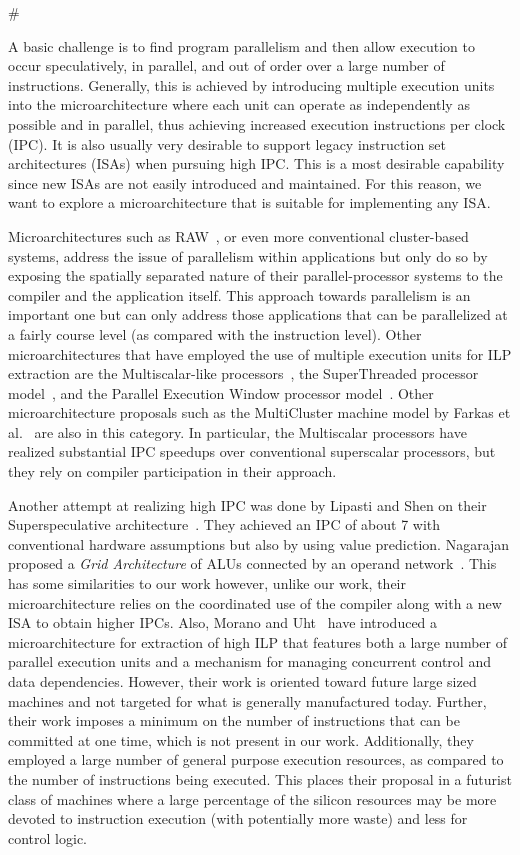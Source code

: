 #\documentclass[10pt,dvips]{article}
\begin{document}
A basic challenge 
is to find program parallelism and then allow execution to occur
speculatively, in parallel, and out of order over 
a large number of instructions.
Generally, this is achieved by introducing multiple
execution units into the microarchitecture where each unit
can operate as independently as possible and in parallel, thus
achieving increased execution instructions per clock (IPC).
It is also usually very desirable to support legacy instruction
set architectures (ISAs) when pursuing high IPC. 
This is a most desirable capability since new ISAs are
not easily introduced and maintained.
For this reason, we want to explore a
microarchitecture that is suitable for implementing any ISA.

Microarchitectures such as RAW~\cite{waingold97,taylor02},
or even more conventional cluster-based systems,
address the issue of parallelism within applications but only do so
by exposing the spatially separated nature of their
parallel-processor systems to the compiler and the application itself.
This approach towards parallelism is an important one but
can only address those applications that can be parallelized at
a fairly course level (as compared with the instruction level).
Other microarchitectures that have employed the
use of multiple execution units for ILP extraction are the Multiscalar-like
processors~\cite{Sohi95,sundararaman97multiscalar},
the SuperThreaded processor model~\cite{tsai96superthread},
and
the Parallel Execution Window processor model~\cite{kemp96pew}.
Other microarchitecture proposals such as the MultiCluster machine
model by 
Farkas et al.~\cite{farkas97multicluster} are also in this category.
In particular, the Multiscalar processors have
realized substantial IPC speedups over conventional superscalar
processors, but they rely on compiler participation in their
approach.

Another attempt at realizing high IPC was done by
Lipasti and Shen on their Superspeculative
architecture~\cite{Lip97}.  They achieved an IPC of
about 7 with conventional hardware assumptions but
also by using value prediction.
Nagarajan proposed a {\em Grid Architecture} of ALUs
connected by an operand network~\cite{Nag01}.  
This has some similarities to our work
however, unlike our work, their microarchitecture
relies on the coordinated use of the compiler along with
a new ISA to obtain higher IPCs.
Also, Morano and Uht~\cite{morano02high,uht02realizing}
have introduced a microarchitecture for extraction of
high ILP that features both
a large number of parallel execution units and a 
mechanism for managing concurrent control and data dependencies.
However, their work is oriented toward future large sized machines
and not targeted for what is generally manufactured today.
Further, their work imposes a minimum on the number of instructions
that can be committed at one time, which is not present in our work.
Additionally, they 
employed a large number of general purpose execution resources, as
compared to the number of instructions being executed.
This places their proposal in a futurist class of machines
where a large percentage of the silicon resources may be more 
devoted to instruction execution (with potentially more waste) 
and less for control logic.
\end{document}
